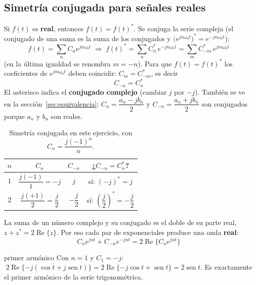 \documentclass[11pt,a4paper]{article}
\DeclareMathOperator{\sen}{sen}
\DeclareMathOperator{\Real}{Re}
\begin{document}
\subsection{Simetría conjugada para señales reales}
Si $f(t)$ es \textbf{real}, entonces $f(t)=f(t)^{*}$. Se conjuga la serie compleja (el
conjugado de una suma es la suma de los conjugados y
$\big(e^{jn\omega_0t}\big)^{*}=e^{-jn\omega_0t}$):
\begin{equation*}
  f(t)=\sum_{n}C_ne^{jn\omega_0t}\;\Rightarrow\;
  f(t)^{*}=\sum_{n}C_n^{*}\,e^{-jn\omega_0t}=\sum_{m}C_{-m}^{*}\,e^{jm\omega_0t}
\end{equation*}
(en la última igualdad se renombra $m=-n$). Para que $f(t)=f(t)^{*}$ los coeficientes de
$e^{jm\omega_0t}$ deben coincidir: $C_m=C_{-m}^{*}$, es decir
\begin{equation*}
  \boxed{C_{-n}=C_n^{*}}
\end{equation*}
El asterisco indica el \textbf{conjugado complejo} (cambiar $j$ por $-j$). También se ve en
la sección~\ref{sec:equivalencia}: $C_n=\dfrac{a_n-jb_n}{2}$ y $C_{-n}=\dfrac{a_n+jb_n}{2}$
son conjugados porque $a_n$ y $b_n$ son reales.

\begin{table}[H]
\centering
\caption{Simetría conjugada en este ejercicio, con $C_n=\dfrac{j(-1)^{n}}{n}$.}
\renewcommand{\arraystretch}{1.6}
\begin{tabular}{cccc}
\toprule
$n$ & $C_n$ & $C_{-n}$ & ¿$C_{-n}=C_n^{*}$?\\
\midrule
$1$ & $\dfrac{j(-1)}{1}=-j$ & $j$ & sí: $(-j)^{*}=j$\\
$2$ & $\dfrac{j(+1)}{2}=\dfrac{j}{2}$ & $-\dfrac{j}{2}$ & sí: $\left(\dfrac{j}{2}\right)^{*}=-\dfrac{j}{2}$\\
\bottomrule
\end{tabular}
\end{table}

La suma de un número complejo y su conjugado es el doble de su parte real,
$z+z^{*}=2\Real\{z\}$. Por eso cada par de exponenciales produce una onda \textbf{real}:
\begin{equation*}
  C_ne^{jnt}+C_{-n}e^{-jnt}=2\Real\{C_ne^{jnt}\}
\end{equation*}
\begin{ejemplo}{primer armónico}
Con $n=1$ y $C_1=-j$:
$\;2\Real\{-j(\cos t+j\sen t)\}=2\Real\{-j\cos t+\sen t\}=2\sen t$.
Es exactamente el primer armónico de la serie trigonométrica.
\end{ejemplo}
\end{document}
